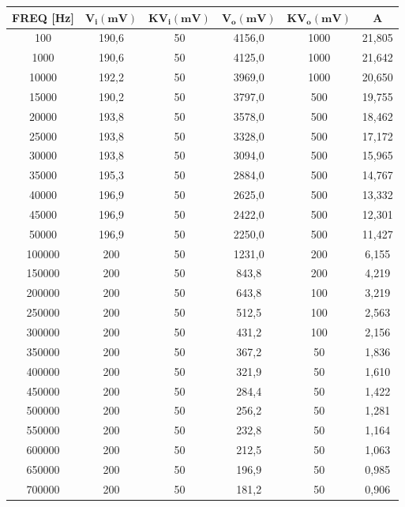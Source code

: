 \begin{table}[!ht]
    \centering
    \begin{tabular}{|c|c|c|c|c|c|}
    \hline

        \textbf{FREQ [Hz]} & $\bm{V_i(mV)}$ & $\bm{KV_i(mV)}$ & $\bm{V_o(mV)}$ & $\bm{KV_o(mV)}$ & \textbf{A} \\ \hline

      
        100 & 190,6 & 50 & 4156,0 & 1000 & 21,805  \\ \hline
        1000 & 190,6 & 50 & 4125,0 & 1000 & 21,642  \\ \hline
        10000 & 192,2 & 50 & 3969,0 & 1000 & 20,650 \\ \hline
        15000 & 190,2 & 50 & 3797,0 & 500 & 19,755  \\ \hline
        20000 & 193,8 & 50 & 3578,0 & 500 & 18,462 \\ \hline
        25000 & 193,8 & 50 & 3328,0 & 500 & 17,172  \\ \hline
        30000 & 193,8 & 50 & 3094,0 & 500 & 15,965  \\ \hline
        35000 & 195,3 & 50 & 2884,0 & 500 & 14,767  \\ \hline
        40000 & 196,9 & 50 & 2625,0 & 500 & 13,332  \\ \hline
        45000 & 196,9 & 50 & 2422,0 & 500 & 12,301  \\ \hline
        50000 & 196,9 & 50 & 2250,0 & 500 & 11,427  \\ \hline
        100000 & 200 & 50 & 1231,0 & 200 & 6,155  \\ \hline
        150000 & 200 & 50 & 843,8 & 200 & 4,219  \\ \hline
        200000 & 200 & 50 & 643,8 & 100 & 3,219  \\ \hline
        250000 & 200 & 50 & 512,5 & 100 & 2,563  \\ \hline
        300000 & 200 & 50 & 431,2 & 100 & 2,156  \\ \hline
        350000 & 200 & 50 & 367,2 & 50 & 1,836	\\ \hline																				
        400000	& 200 & 50 & 321,9 & 50 & 1,610	\\ \hline																			
        450000	& 200	& 50	& 284,4	& 50	& 1,422 \\ \hline													
        500000 &	200 &	50 &	256,2 &	50 &	1,281	\\ \hline							
        550000 &	200 &	50 &	232,8 &	50 &	1,164 \\ \hline																		
        600000 &	200 &	50 &	212,5 &	50 &	1,063	\\ \hline																
        650000 &	200 &	50 &	196,9 &	50 &	0,985 \\ \hline																
        700000 &	200 &	50 &	181,2 &	50 &	0,906	\\ \hline																
        
    \end{tabular}
\end{table}
\FloatBarrier

